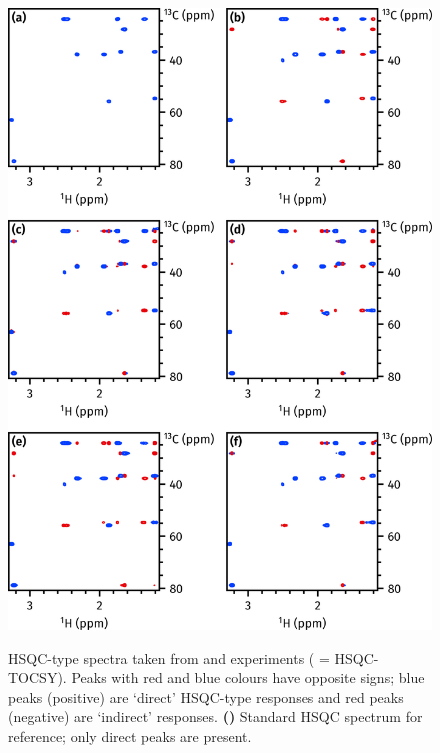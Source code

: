 \documentclass[a4paper,12pt]{article}
\begin{document}
\begin{refsection}
\begin{figure}[!htp]
    \centering
    \includegraphics[]{hsqccosy_comp.png}%
    {\label{fig:hsqccosy_comp_hsqc}}%
    {\label{fig:hsqccosy_comp_clip}}%
    {\label{fig:hsqccosy_comp_dse}}%
    {\label{fig:hsqccosy_comp_tse_norps}}%
    {\label{fig:hsqccosy_comp_tocsy}}%
    {\label{fig:hsqccosy_comp_tse}}%
    \caption[Comparison of spectra acquired with different HSQC-COSY modules]{
        HSQC-type spectra taken from  and  experiments ( = HSQC-TOCSY).
        Peaks with red and blue colours have opposite signs; blue peaks (positive) are `direct' HSQC-type responses and red peaks (negative) are `indirect' responses.
        \textbf{()} Standard HSQC spectrum for reference; only direct peaks are present.
}
\end{figure}
\end{refsection}
\end{document}
